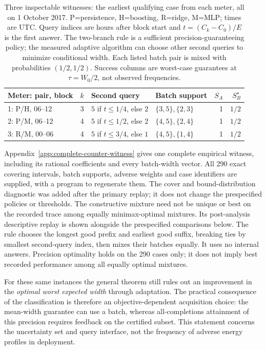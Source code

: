 \begin{table}[htbp]\centering\small
\caption{Three inspectable witnesses: the earliest qualifying case from
each meter, all on 1 October 2017. P=persistence, H=boosting, R=ridge,
M=MLP; times are UTC. Query indices are hours after block start and
$t=(C_k-C_0)/E$ is the first answer. The two-branch rule is a sufficient
precision-guaranteeing policy; the measured adaptive algorithm can choose
other second queries to minimize conditional width. Each listed batch
pair is mixed with probabilities $(1/2,1/2)$. Success columns are worst-case
guarantees at $\tau=W_0/2$, not observed frequencies.}
\label{tab:counter-witnesses}
\begin{tabular}{lcllrr}\toprule
Meter: pair, block & $k$ & Second query & Batch support & $S_A$ & $S_B^\star$\\\midrule
1: P/H, 06--12 & 3 & $5$ if $t\leq1/4$, else $2$ & $\{3,5\},\{2,3\}$ & 1 & $1/2$\\
2: P/M, 06--12 & 4 & $5$ if $t\leq1/2$, else $2$ & $\{4,5\},\{2,4\}$ & 1 & $1/2$\\
3: R/M, 00--06 & 4 & $5$ if $t\leq3/4$, else $1$ & $\{4,5\},\{1,4\}$ & 1 & $1/2$\\\bottomrule
\end{tabular}\end{table}
Appendix~\ref{app:complete-counter-witness} gives one complete empirical
witness, including its rational coefficients and every batch-width vector.
All 290 exact covering intervals, batch supports, adverse weights and
case identifiers are supplied, with a program to regenerate them.
The cover and bound-distribution diagnostic was added after the primary
replay; it does not change the prespecified policies or thresholds.
The constructive mixture need not be unique or best on the recorded
trace among equally minimax-optimal mixtures. Its post-analysis descriptive replay is shown alongside the prespecified
comparisons below. The rule chooses the longest good prefix and earliest
good suffix, breaking ties by smallest second-query index, then mixes
their batches equally. It uses no internal answers. Precision optimality
holds on the 290 cases only; it does not imply best recorded performance
among all equally optimal mixtures.

For these same instances the general theorem still rules out an improvement
in the \emph{optimal worst expected width} through adaptation. The practical
consequence of the classification is therefore an objective-dependent
acquisition choice: the mean-width guarantee can use a batch, whereas
all-completions attainment of this precision requires feedback on the
certified subset. This statement concerns the uncertainty set and query
interface, not the frequency of adverse energy profiles in deployment.


